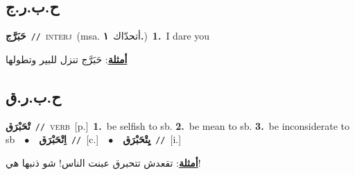 \documentclass[10pt,a4paper,twoside]{article} %
\begin{document}
\begin{multicols}{2}
\vspace{-3mm}
\subsection*{\color{blue}\foreignlanguage{arabic}{ح.ب.ر.ج}\color{blue}{ (ntws)}} 

{\setlength\topsep{0pt}\textbf{\foreignlanguage{arabic}{حَبَرَّج}}\ {\color{gray}\texttt{//}\color{black}}\ \textsc{interj}\ \color{gray}(msa. \foreignlanguage{arabic}{أتحدّاك}~\foreignlanguage{arabic}{\textbf{١.}})\color{black}\ \textbf{1.}~I dare you\  \begin{flushright}\color{gray}\foreignlanguage{arabic}{\textbf{\underline{\foreignlanguage{arabic}{أمثلة}}}: حَبَرَّج تنزل للبير وتطولها}\end{flushright}\color{black}} \vspace{2mm}

\vspace{-3mm}
\subsection*{\color{blue}\foreignlanguage{arabic}{ح.ب.ر.ق}\color{blue}{}} 

{\setlength\topsep{0pt}\textbf{\foreignlanguage{arabic}{تْحَبْرَق}}\ {\color{gray}\texttt{//}\color{black}}\ \textsc{verb}\ [p.]\ \textbf{1.}~be selfish to sb.  \textbf{2.}~be mean to sb.  \textbf{3.}~be inconsiderate to sb\ \ $\bullet$\ \ \setlength\topsep{0pt}\textbf{\foreignlanguage{arabic}{اِتْحَبْرَق}}\ {\color{gray}\texttt{//}\color{black}}\ [c.]\ \ $\bullet$\ \ \setlength\topsep{0pt}\textbf{\foreignlanguage{arabic}{يِتْحَبْرَق}}\ {\color{gray}\texttt{//}\color{black}}\ [i.]\  \begin{flushright}\color{gray}\foreignlanguage{arabic}{\textbf{\underline{\foreignlanguage{arabic}{أمثلة}}}: تقعدش تتحبرق عبنت الناس! شو ذنبها هي!}\end{flushright}\color{black}} \vspace{2mm}


\end{multicols}
\end{document}
